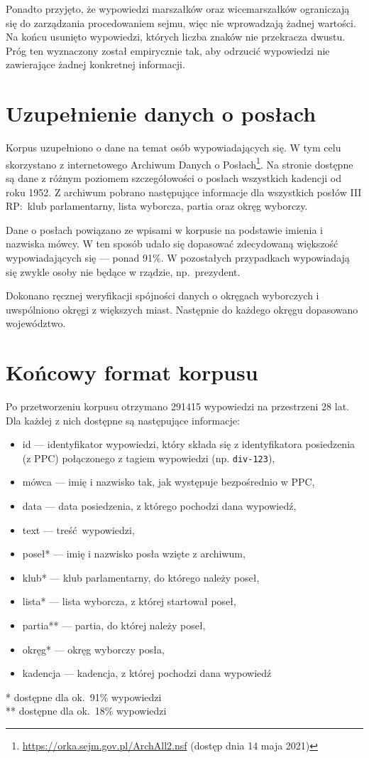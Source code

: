   Ponadto przyjęto, że wypowiedzi marszałków oraz wicemarszałków ograniczają się do zarządzania procedowaniem sejmu,
    więc nie wprowadzają żadnej wartości.
  Na końcu usunięto wypowiedzi, których liczba znaków nie przekracza dwustu.
  Próg ten wyznaczony został empirycznie tak, aby odrzucić wypowiedzi nie zawierające żadnej konkretnej informacji.

\section{Uzupełnienie danych o posłach}
  Korpus uzupełniono o dane na temat osób wypowiadających się.
  W tym celu skorzystano z internetowego Archiwum Danych o Posłach\footnote{\url{https://orka.sejm.gov.pl/ArchAll2.nsf} (dostęp dnia 14 maja 2021)}.
  Na stronie dostępne są dane z różnym poziomem szczegółowości o posłach wszystkich kadencji od roku 1952.
  Z archiwum pobrano następujące informacje dla wszystkich posłów III RP:\ klub parlamentarny, lista wyborcza, partia oraz okręg wyborczy.

  Dane o posłach powiązano ze wpisami w korpusie na podstawie imienia i nazwiska mówcy.
  W ten sposób udało się dopasować zdecydowaną większość wypowiadających się --- ponad 91\%.
  W pozostałych przypadkach wypowiadają się zwykle osoby nie będące w rządzie, np.\ prezydent.

  Dokonano ręcznej weryfikacji spójności danych o okręgach wyborczych i uwspólniono okręgi z większych miast.
  Następnie do każdego okręgu dopasowano województwo.

\section{Końcowy format korpusu}
  Po przetworzeniu korpusu otrzymano 291415 wypowiedzi na przestrzeni 28 lat.
  Dla każdej z nich dostępne są następujące informacje:
  \begin{itemize}
    \item id --- identyfikator wypowiedzi, który składa się z identyfikatora posiedzenia (z PPC) połączonego z tagiem wypowiedzi (np. \verb|div-123|),
    \item mówca --- imię i nazwisko tak, jak występuje bezpośrednio w PPC,
    \item data --- data posiedzenia, z którego pochodzi dana wypowiedź,
    \item text --- treść wypowiedzi,
    \item poseł* --- imię i nazwisko posła wzięte z archiwum,
    \item klub* --- klub parlamentarny, do którego należy poseł,
    \item lista* --- lista wyborcza, z której startował poseł,
    \item partia** --- partia, do której należy poseł,
    \item okręg* --- okręg wyborczy posła,
    \item kadencja --- kadencja, z której pochodzi dana wypowiedź
  \end{itemize}
  \vspace{1em}
  * dostępne dla ok.~91\% wypowiedzi\\
  ** dostępne dla ok.~18\% wypowiedzi